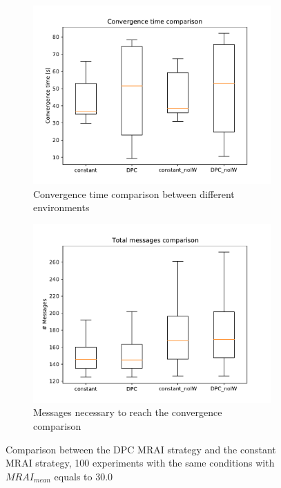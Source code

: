 \documentclass[10pt,conference,letterpaper]{IEEEtran}
\newcommand{\figwidth}{0.78}
\newcommand{\figvspace}{-1.5em}
\begin{document}
\begin{figure}[tb]
	\centering

	\begin{subfigure}{\columnwidth}
		\centering
		\includegraphics[width=\figwidth\columnwidth]{images/internet_like/dpc-vs-constant-30fixed/constant-dpc-comparison-30fixed_time_boxplot}
		\caption{Convergence time comparison between different environments}
		\label{fig:dpc_vs_constant_convergence_time}
		\qquad
	\end{subfigure}

	\begin{subfigure}{\columnwidth}
		\centering
		\includegraphics[width=\figwidth\columnwidth]{images/internet_like/dpc-vs-constant-30fixed/constant-dpc-comparison-30fixed_messages_boxplot}
		\caption{Messages necessary to reach the convergence comparison}
		\label{fig:dpc_vs_constant_messages}
		\qquad
	\end{subfigure}

	\caption{Comparison between the \ac{DPC} \ac{MRAI} strategy and the constant \ac{MRAI}
			 strategy, 100 experiments with the same conditions with $MRAI_{mean}$
			 equals to \num{30.0}}
	\label{fig:dpc_vs_constant}
	\vspace{\figvspace}
\end{figure}
\end{document}
